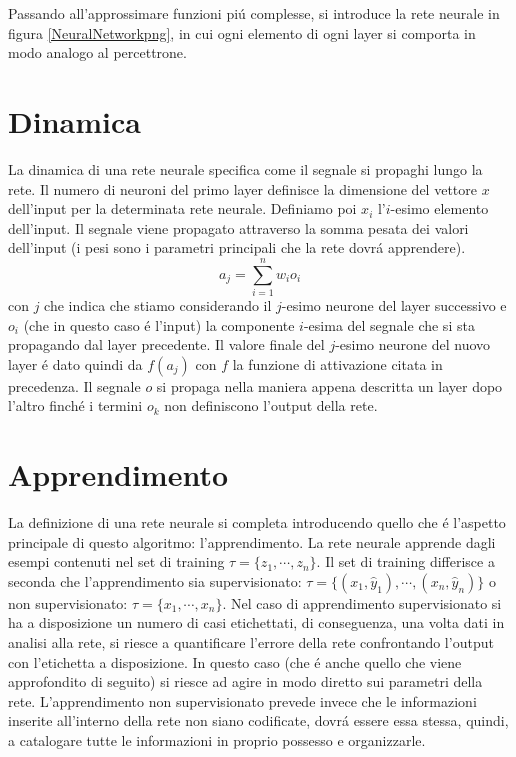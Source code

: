 \documentclass[a4paper,12pt]{report}
\begin{document}
 Passando all'approssimare funzioni pi\'u complesse, si introduce la rete neurale in figura \ref{NeuralNetworkpng}, in cui ogni elemento di ogni layer si comporta in modo analogo al percettrone.

 
 \section{Dinamica}
 
 La dinamica di una rete neurale specifica come il segnale si propaghi lungo la rete. 
 Il numero di neuroni del primo layer definisce la dimensione del vettore $x$ dell'input per la determinata rete neurale. 
 Definiamo poi $x_i$ l'$i$-esimo elemento dell'input. 
 Il segnale viene propagato attraverso la somma pesata dei valori dell'input (i pesi sono i parametri principali che la rete dovr\'a apprendere).
 \begin{equation}
  a_j = \sum_{i=1}^n w_i o_i
 \end{equation}
 con $j$ che indica che stiamo considerando il $j$-esimo neurone del layer successivo e $o_i$ (che in questo caso \'e l'input) la componente $i$-esima del segnale che si sta propagando dal layer precedente. 
 Il valore finale del $j$-esimo neurone del nuovo layer \'e dato quindi da $f(a_j)$ con $f$ la funzione di attivazione citata in precedenza. 
 Il segnale $o$ si propaga nella maniera appena descritta un layer dopo l'altro finch\'e i termini $o_k$ non definiscono l'output della rete.
 
 \section{Apprendimento}
 
 La definizione di una rete neurale si completa introducendo quello che \'e l'aspetto principale di questo algoritmo: l'apprendimento. 
 La rete neurale apprende dagli esempi contenuti nel set di training $\tau = \{ z_1, \cdots ,z_n \} $. Il set di training differisce a seconda che l'apprendimento sia supervisionato: $\tau = \{ (x_1,\widehat{y}_1), \cdots , (x_n,\widehat{y}_n)\}$ o non supervisionato: $\tau = \{x_1,\cdots,x_n\}$.
 Nel caso di apprendimento supervisionato si ha a disposizione un numero di casi etichettati, di conseguenza, una volta dati in analisi alla rete, si riesce a quantificare l'errore della rete confrontando l'output con l'etichetta a disposizione. 
 In questo caso (che \'e anche quello che viene approfondito di seguito) si riesce ad agire in modo diretto sui parametri della rete. 
 L'apprendimento non supervisionato prevede invece che le informazioni inserite all'interno della rete non siano codificate, dovr\'a essere essa stessa, quindi, a catalogare tutte le informazioni in proprio possesso e organizzarle.
 
\end{document}
